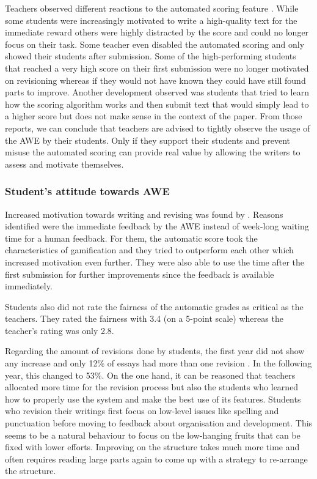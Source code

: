 \documentclass[runningheads]{llncs}
\begin{document}
Teachers observed different reactions to the automated scoring feature \citep{grimes_utility_2010}. While some students were increasingly motivated to write a high-quality text for the immediate reward others were highly distracted by the score and could no longer focus on their task. Some teacher even disabled the automated scoring and only showed their students after submission. Some of the high-performing students that reached a very high score on their first submission were no longer motivated on revisioning whereas if they would not have known they could have still found parts to improve. Another development observed was students that tried to learn how the scoring algorithm works and then submit text that would simply lead to a higher score but does not make sense in the context of the paper. From those reports, we can conclude that teachers are advised to tightly observe the usage of the AWE by their students. Only if they support their students and prevent misuse the automated scoring can provide real value by allowing the writers to assess and motivate themselves.

\subsubsection{Student's attitude towards AWE}
Increased motivation towards writing and revising was found by \textcite{grimes_utility_2010}. Reasons identified were the immediate feedback by the AWE instead of week-long waiting time for a human feedback. For them, the automatic score took the characteristics of gamification and they tried to outperform each other which increased motivation even further. They were also able to use the time after the first submission for further improvements since the feedback is available immediately.

Students also did not rate the fairness of the automatic grades as critical as the teachers. They rated the fairness with 3.4 (on a 5-point scale) whereas the teacher's rating was only 2.8.

Regarding the amount of revisions done by students, the first year did not show any increase and only 12\% of essays had more than one revision \citep{grimes_utility_2010}. In the following year, this changed to 53\%. On the one hand, it can be reasoned that teachers allocated more time for the revision process but also the students who learned how to properly use the system and make the best use of its features.   Students who revision their writings first focus on low-level issues like spelling and punctuation before moving to feedback about organisation and development. This seems to be a natural behaviour to focus on the low-hanging fruits that can be fixed with lower efforts. Improving on the structure takes much more time and often requires reading large parts again to come up with a strategy to re-arrange the structure.
\end{document}
